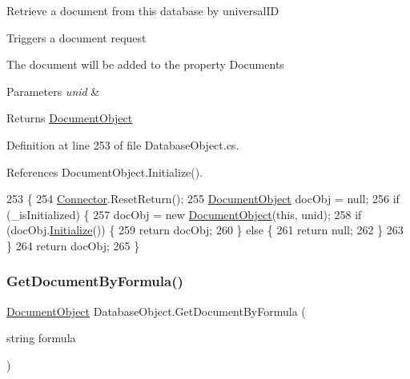 Retrieve a document from this database by universal\+ID 

Triggers a document request

The document will be added to the property \textquotesingle{}Documents\textquotesingle{}


\begin{DoxyParams}{Parameters}
{\em unid} & \\
\hline
\end{DoxyParams}
\begin{DoxyReturn}{Returns}
\hyperlink{class_document_object}{Document\+Object}
\end{DoxyReturn}


Definition at line 253 of file Database\+Object.\+cs.



References Document\+Object.\+Initialize().


\begin{DoxyCode}
253                                                    \{
254         \hyperlink{class_connector}{Connector}.ResetReturn();
255         \hyperlink{class_document_object}{DocumentObject} docObj = null;
256         \textcolor{keywordflow}{if} (\_isInitialized) \{
257             docObj = \textcolor{keyword}{new} \hyperlink{class_document_object}{DocumentObject}(\textcolor{keyword}{this}, unid);
258             \textcolor{keywordflow}{if}  (docObj.\hyperlink{class_document_object_af4298d6cfbb9ea60643d9995309b73f1}{Initialize}()) \{
259                 \textcolor{keywordflow}{return} docObj;
260             \} \textcolor{keywordflow}{else} \{
261                 \textcolor{keywordflow}{return} null;
262             \}
263         \}
264         \textcolor{keywordflow}{return} docObj;
265     \}
\end{DoxyCode}
\mbox{\label{class_database_object_ae5477aedfcd0d54b21017faa1389bc71}} 
\subsubsection{\texorpdfstring{Get\+Document\+By\+Formula()}{GetDocumentByFormula()}}
{\footnotesize\ttfamily \hyperlink{class_document_object}{Document\+Object} Database\+Object.\+Get\+Document\+By\+Formula (\begin{DoxyParamCaption}\item[{string}]{formula }\end{DoxyParamCaption})}



